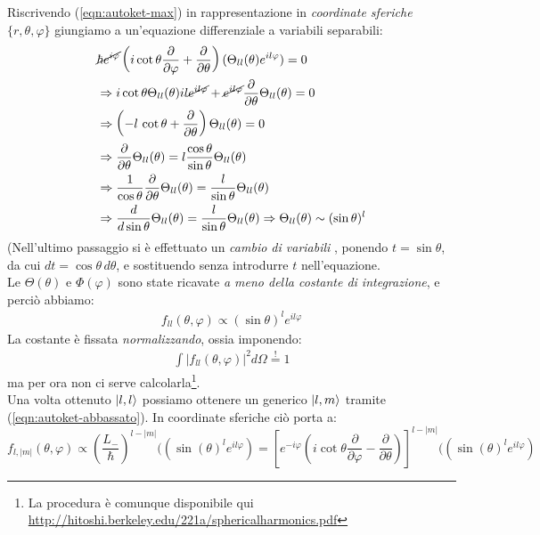 \documentclass[../../FisicaTeorica.tex]{subfiles}
\begin{document}
Riscrivendo (\ref{eqn:autoket-max}) in rappresentazione in \textit{coordinate sferiche} $\{r,\theta,\varphi\}$ giungiamo a un'equazione differenziale a variabili separabili: 
\begin{align*}
&\cancel{\hbar e^{i\varphi}}\left(i\cot \theta \frac{\partial}{\partial \varphi}+\frac{\partial}{\partial \theta}\right) (\Theta_{ll}(\theta)e^{il\varphi})=0\\
&\Rightarrow i\cot \theta \Theta_{ll}(\theta) il \cancel{e^{il\varphi} }+ \cancel{e^{il\varphi}}\frac{\partial}{\partial \theta} \Theta_{ll}(\theta) =0 \\
&\Rightarrow \left(-l\,\cot\theta  + \frac{\partial}{\partial \theta}\right)\Theta_{ll}(\theta)=0\\
&\Rightarrow \frac{\partial}{\partial \theta} \Theta_{ll}(\theta) = l\frac{\cos\theta}{\sin\theta} \Theta_{ll}(\theta)\\
&\Rightarrow \frac{1}{\cos\theta}\frac{\partial}{\partial \theta} \Theta_{ll}(\theta)=\frac{l}{\sin\theta}\Theta_{ll}(\theta)\\
&\Rightarrow \frac{d}{d\sin\theta}\Theta_{ll}(\theta)=\frac{l}{\sin\theta}\Theta_{ll}(\theta)\Rightarrow \Theta_{ll}(\theta) \sim (\sin\theta)^l
\end{align*}
(Nell'ultimo passaggio si è effettuato un \textit{cambio di variabili} , ponendo $t=\sin\theta$, da cui $dt = \cos\theta \,d\theta$, e sostituendo senza introdurre $t$ nell'equazione.\\
Le $\Theta(\theta)$ e $\Phi(\varphi)$ sono state ricavate \textit{a meno della costante di integrazione}, e perciò abbiamo:
\begin{align*}
f_{ll}(\theta,\varphi) \propto (\sin\theta)^l e^{il\varphi}
\end{align*}
La costante è fissata \textit{normalizzando}, ossia imponendo:
\begin{align*}
\int |f_{ll}(\theta,\varphi)|^2 d\Omega \overset{!}{=}1
\end{align*}
ma per ora non ci serve calcolarla\footnote{La procedura è comunque disponibile qui \url{http://hitoshi.berkeley.edu/221a/sphericalharmonics.pdf}}.\\
Una volta ottenuto $\Ket{l,l}$ possiamo ottenere un generico $\Ket{l,m}$  tramite (\ref{eqn:autoket-abbassato}). In coordinate sferiche ciò porta a:
\[
f_{l,|m|}(\theta,\varphi) \propto \left(\frac{L_-}{\hbar}\right)^{l-|m|}((\sin(\theta)^l e^{il\varphi}) = \left[e^{-i\varphi}\left( i \cot\theta\frac{\partial}{\partial \varphi}-\frac{\partial}{\partial \theta}\right)\right]^{l-|m|}((\sin(\theta)^l e^{il\varphi})
\]
\end{document}
